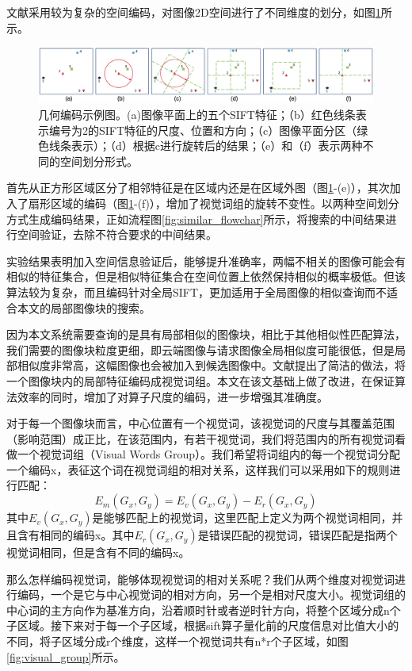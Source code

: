 文献\cite{Zhou:2013jz}采用较为复杂的空间编码，对图像2D空间进行了不同维度的划分，如图\ref{fig:geo_coding}所示。
\begin{figure}
\centering\includegraphics[width=15cm]{imgs/ch3/geo_coding}
\caption{几何编码示例图。(a)图像平面上的五个SIFT特征；（b）红色线条表示编号为2的SIFT特征的尺度、位置和方向；（c）图像平面分区（绿色线条表示）；（d）根据c进行旋转后的结果；（e）和（f）表示两种不同的空间划分形式。}
\label{fig:geo_coding}
\end{figure}

首先从正方形区域区分了相邻特征是在区域内还是在区域外图（图\ref{fig:geo_coding}-(e)），其次加入了扇形区域的编码（图\ref{fig:geo_coding}-(f)），增加了视觉词组的旋转不变性。以两种空间划分方式生成编码结果，正如流程图\ref{fig:similar_flowchar}所示，将搜索的中间结果进行空间验证，去除不符合要求的中间结果。

实验结果表明加入空间信息验证后，能够提升准确率，两幅不相关的图像可能会有相似的特征集合，但是相似特征集合在空间位置上依然保持相似的概率极低。但该算法较为复杂，而且编码针对全局SIFT，更加适用于全局图像的相似查询而不适合本文的局部图像块的搜索。

因为本文系统需要查询的是具有局部相似的图像块，相比于其他相似性匹配算法，我们需要的图像块粒度更细，即云端图像与请求图像全局相似度可能很低，但是局部相似度非常高，这幅图像也会被加入到候选图像中。文献\cite{Dai:2012vn}提出了简洁的做法，将一个图像块内的局部特征编码成视觉词组。本文在该文基础上做了改进，在保证算法效率的同时，增加了对算子尺度的编码，进一步增强其准确度。

对于每一个图像块而言，中心位置有一个视觉词，该视觉词的尺度与其覆盖范围（影响范围）成正比，在该范围内，有若干视觉词，我们将范围内的所有视觉词看做一个视觉词组（Visual Words Group）。我们希望将词组内的每一个视觉词分配一个编码x，表征这个词在视觉词组的相对关系，这样我们可以采用如下的规则进行匹配：
\begin{equation}
E_m(G_x,G_y) = E_v(G_x,G_y) - E_r(G_x,G_y)
\end{equation}
其中\(E_v(G_x,G_y)\)是能够匹配上的视觉词，这里匹配上定义为两个视觉词相同，并且含有相同的编码x。其中\(E_r(G_x,G_y)\)是错误匹配的视觉词，错误匹配是指两个视觉词相同，但是含有不同的编码x。

那么怎样编码视觉词，能够体现视觉词的相对关系呢？我们从两个维度对视觉词进行编码，一个是它与中心视觉词的相对方向，另一个是相对尺度大小。视觉词组的中心词的主方向作为基准方向，沿着顺时针或者逆时针方向，将整个区域分成n个子区域。接下来对于每一个子区域，根据sift算子量化前的尺度信息对比值大小的不同，将子区域分成r个维度，这样一个视觉词共有n*r个子区域，如图\ref{fig:visual_group}所示。

